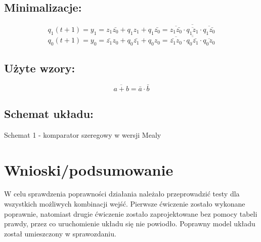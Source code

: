 \documentclass[12pt,a4paper]{article}
\begin{document}
		\subsection{Minimalizacje:}
			\begin{displaymath}
			q_1(t+1) = y_1 = z_1\bar{z_0} + q_1z_1 + q_1\bar{z_0}= \overline{\overline{z_1\bar{z_0}} \cdot \overline{q_1z_1} \cdot \overline{q_1\bar{z_0}}}
			\end{displaymath}
			\begin{displaymath}
			q_0(t+1) = y_0 = \bar{z_1}z_0 + q_0\bar{z_1} + q_0z_0= \overline{\overline{\bar{z_1}z_0} \cdot \overline{q_0\bar{z_1}} \cdot \overline{q_0z_0}}
			\end{displaymath}
		
		\subsection{Użyte wzory:}
			\begin{equation}
			\overline{a+b}=\bar{a}\cdot\bar{b}
			\end{equation}
		
		\subsection{Schemat układu:}
		
		\vspace{1.5cm}
		\begin{center}
			Schemat 1 - komparator szeregowy w wersji Mealy
		\end{center}

	\section{Wnioski/podsumowanie}
	
			W celu sprawdzenia poprawności działania należało przeprowadzić testy dla wszystkich możliwych kombinacji wejść. Pierwsze ćwiczenie zostało wykonane poprawnie, natomiast drugie ćwiczenie zostało zaprojektowane bez pomocy tabeli prawdy, przez co uruchomienie układu się nie powiodło. Poprawny model układu został umieszczony w sprawozdaniu.
	
\end{document}
